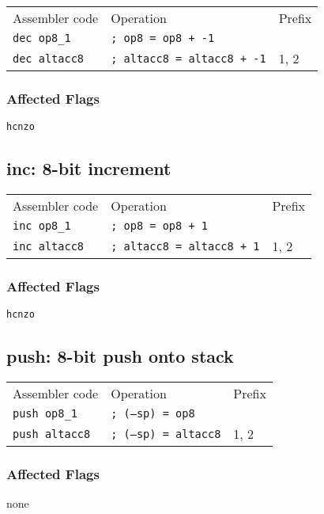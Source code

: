 \documentclass{book}
\begin{document}
\begin{tabular}{l l l}
Assembler code       & Operation                         & Prefix \\
\texttt{dec op8\_1}  & \texttt{; op8 = op8 + -1}         & \\
\texttt{dec altacc8} & \texttt{; altacc8 = altacc8 + -1} & 1, 2
\end{tabular}

\subsubsection*{Affected Flags}

\texttt{hcnzo}


\subsection{inc: 8-bit increment}

\begin{tabular}{l l l}
Assembler code       & Operation                        & Prefix \\
\texttt{inc op8\_1}  & \texttt{; op8 = op8 + 1}         & \\
\texttt{inc altacc8} & \texttt{; altacc8 = altacc8 + 1} & 1, 2
\end{tabular}

\subsubsection*{Affected Flags}

\texttt{hcnzo}


\subsection{push: 8-bit push onto stack}

\begin{tabular}{l l l}
Assembler code        & Operation                   & Prefix \\
\texttt{push op8\_1}  & \texttt{; (--sp) = op8}     & \\
\texttt{push altacc8} & \texttt{; (--sp) = altacc8} & 1, 2
\end{tabular}

\subsubsection*{Affected Flags}

none
\end{document}
